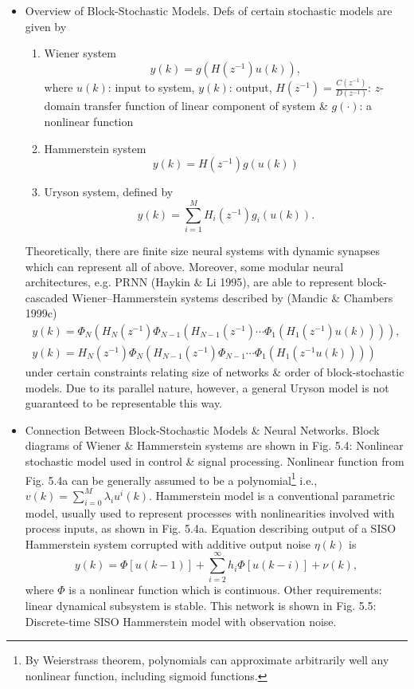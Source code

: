 \documentclass{article}
\begin{document}
\begin{enumerate}
\begin{itemize}
\begin{itemize}
			\begin{itemize}
				\item {\sf Overview of Block-Stochastic Models.} Defs of certain stochastic models are given by
				\begin{enumerate}
					\item Wiener system
					\begin{equation}
						y(k) = g(H(z^{-1})u(k)),
					\end{equation}
					where $u(k)$: input to system, $y(k)$: output, $H(z^{-1}) = \frac{C(z^{-1})}{D(z^{-1})}$: $z$-domain transfer function of linear component of system \& $g(\cdot)$: a nonlinear function
					\item Hammerstein system
					\begin{equation}
						y(k) = H(z^{-1})g(u(k))
					\end{equation}
					\item Uryson system, defined by
					\begin{equation}
						y(k) = \sum_{i=1}^M H_i(z^{-1})g_i(u(k)).
					\end{equation}
				\end{enumerate}
				Theoretically, there are finite size neural systems with dynamic synapses which can represent all of above. Moreover, some modular neural architectures, e.g. PRNN (Haykin \& Li 1995), are able to represent block-cascaded Wiener--Hammerstein systems described by (Mandic \& Chambers 1999c)
				\begin{align}
					y(k) = \Phi_N(H_N(z^{-1})\Phi_{N-1}(H_{N-1}(z^{-1})\cdots\Phi_1(H_1(z^{-1})u(k)))),\\
					y(k) = H_N(z^{-1})\Phi_N(H_{N-1}(z^{-1})\Phi_{N-1}\cdots\Phi_1(H_1(z^{-1}u(k))))
				\end{align}
				under certain constraints relating size of networks \& order of block-stochastic models. Due to its parallel nature, however, a general Uryson model is not guaranteed to be representable this way.
				\item {\sf Connection Between Block-Stochastic Models \& Neural Networks.} Block diagrams of Wiener \& Hammerstein systems are shown in {\sf Fig. 5.4: Nonlinear stochastic model used in control \& signal processing}. Nonlinear function from Fig. 5.4a can be generally assumed to be a polynomial\footnote{By Weierstrass theorem, polynomials can approximate arbitrarily well any nonlinear function, including sigmoid functions.} i.e., $v(k) = \sum_{i=0}^M \lambda_iu^i(k)$. Hammerstein model is a conventional parametric model, usually used to represent processes with nonlinearities involved with process inputs, as shown in Fig. 5.4a. Equation describing output of a SISO Hammerstein system corrupted with additive output noise $\eta(k)$ is
				\begin{equation}
					y(k) = \Phi[u(k - 1)] + \sum_{i=2}^\infty h_i\Phi[u(k - i)] + \nu(k),
				\end{equation}
				where $\Phi$ is a nonlinear function which is continuous. Other requirements: linear dynamical subsystem is stable. This network is shown in {\sf Fig. 5.5: Discrete-time SISO Hammerstein model with observation noise}.
				

\end{itemize}
\end{itemize}
\end{itemize}
\end{enumerate}
\end{document}
